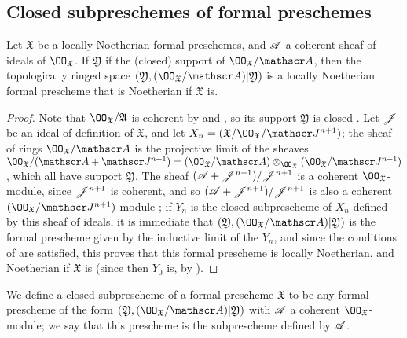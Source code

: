 \subsection{Closed subpreschemes of formal preschemes}
\label{subsection:1.10.14}

\begin{prop}[10.14.1]
\label{1.10.14.1}
Let $\mathfrak{X}$ be a locally Noetherian formal preschemes, and $\mathscr{A}$ a coherent sheaf of ideals of $\OO_\mathfrak{X}$.
If $\mathfrak{Y}$ if the (closed) support of $\OO_\mathfrak{X}/\sh{A}$, then the topologically ringed space $(\mathfrak{Y},(\OO_\mathfrak{X}/\sh{A})|\mathfrak{Y})$ is a locally Noetherian formal prescheme that is Noetherian if $\mathfrak{X}$ is.
\end{prop}

\begin{proof}
\label{proof-1.10.14.1}
Note that $\OO_\mathfrak{X}/\mathfrak{A}$ is coherent by  and , so its support $\mathfrak{Y}$ is closed .
Let $\mathscr{J}$ be an ideal of definition of $\mathfrak{X}$, and let $X_n=(\mathfrak{X}/\OO_\mathfrak{X}/\sh{J}^{n+1})$;
the sheaf of rings $\OO_\mathfrak{X}/\sh{A}$ is the projective limit of the sheaves $\OO_\mathfrak{X}/(\sh{A}+\sh{J}^{n+1})=(\OO_\mathfrak{X}/\sh{A})\otimes_{\OO_\mathfrak{X}}(\OO_\mathfrak{X}/\sh{J}^{n+1})$ , which all have support $\mathfrak{Y}$.
The sheaf $(\mathscr{A}+\mathscr{J}^{n+1})/\mathscr{J}^{n+1}$ is a coherent $\OO_\mathfrak{X}$-module, since $\mathscr{J}^{n+1}$ is coherent, and so $(\mathscr{A}+\mathscr{J}^{n+1})/\mathscr{J}^{n+1}$ is also a coherent $(\OO_\mathfrak{X}/\sh{J}^{n+1})$-module ;
if $Y_n$ is the closed subprescheme of $X_n$ defined by this sheaf of ideals, it is immediate that $(\mathfrak{Y},(\OO_\mathfrak{X}/\sh{A})|\mathfrak{Y})$
is the formal prescheme given by the inductive limit of the $Y_n$, and since the conditions of  are satisfied, this proves that this formal prescheme is locally Noetherian, and Noetherian if $\mathfrak{X}$ is (since then $Y_0$ is, by ).
\end{proof}

\begin{defn}[10.14.2]
\label{1.10.14.2}
We define a closed subprescheme of a formal prescheme $\mathfrak{X}$ to be any formal prescheme of the form $(\mathfrak{Y},(\OO_\mathfrak{X}/\sh{A})|\mathfrak{Y})$ with $\mathscr{A}$ a coherent $\OO_\mathfrak{X}$-module;
we say that this prescheme is the subprescheme defined by $\mathscr{A}$.
\end{defn}

